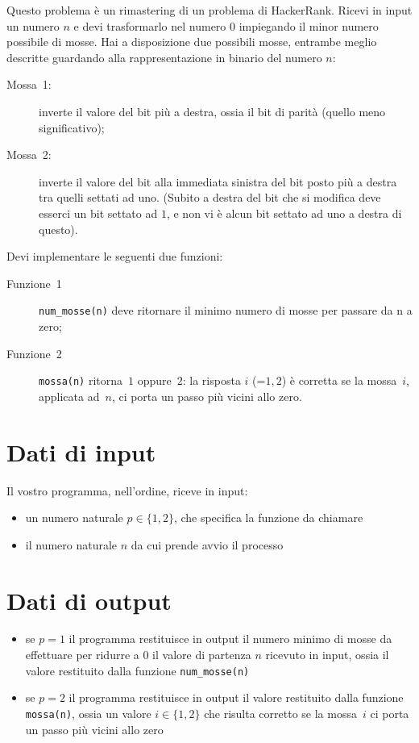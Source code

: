 \renewcommand{\nomebreve}{bit\_edit\_to\_zero}
\renewcommand{\titolo}{Da $n$ a zero ... \\in meno mosse possibili}


\introduzione{}

{\small Questo problema è un rimastering di un problema di HackerRank.}
Ricevi in input un numero $n$ e devi trasformarlo nel numero $0$ impiegando il minor numero possibile di mosse.
Hai a disposizione due possibili mosse, entrambe meglio descritte guardando alla rappresentazione in binario del numero $n$:
\begin{description}
  \item[Mossa~1:] inverte il valore del bit più a destra, ossia il bit di parità (quello meno significativo);
  \item[Mossa~2:] inverte il valore del bit alla immediata sinistra del bit posto più a destra tra quelli settati ad uno. (Subito a destra del bit che si modifica deve esserci un bit settato ad $1$, e non vi è alcun bit settato ad uno a destra di questo).
\end{description}

Devi implementare le seguenti due funzioni:
\begin{description}
   \item[Funzione~1] {\tt num\_mosse(n)} deve ritornare il minimo numero di mosse per passare da n a zero;
   \item[Funzione~2] {\tt mossa(n)} ritorna~$1$ oppure~$2$: la risposta $i$ (=$1,2$) è corretta se la mossa~$i$, applicata ad~$n$, ci porta un passo più vicini allo zero.
\end{description}

\section*{Dati di input}
Il vostro programma, nell'ordine, riceve in input:
\begin{itemize}
    \item un numero naturale $p\in\{1,2\}$, che specifica la funzione da chiamare
    \item il numero naturale $n$ da cui prende avvio il processo
\end{itemize}


\section*{Dati di output}
\begin{itemize}
\item se $p = 1$ il programma restituisce in output il numero minimo di mosse da effettuare per ridurre a $0$ il valore di partenza $n$ ricevuto in input,
  ossia il valore restituito dalla funzione {\tt num\_mosse(n)}
\item se $p = 2$ il programma restituisce in output il valore restituito dalla funzione {\tt mossa(n)}, ossia un valore $i\in \{1,2\}$ che risulta corretto se la mossa~$i$ ci porta un passo più vicini allo zero
\end{itemize}


